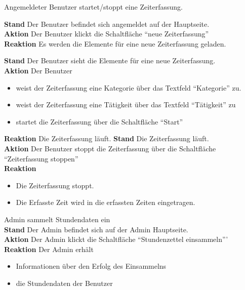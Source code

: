 \begin{requirements}
\begin{requirements}
	\end{requirements}
	 Angemeldeter Benutzer startet/stoppt eine Zeiterfassung.
	\begin{requirements}
            \textbf{Stand} Der Benutzer befindet sich angemeldet auf der Hauptseite. \\
            \textbf{Aktion} Der Benutzer klickt die Schaltfläche "`neue Zeiterfassung"' \\
            \textbf{Reaktion} Es werden die Elemente für eine neue Zeiterfassung geladen.
            \item
                \textbf{Stand} Der Benutzer sieht die Elemente für eine neue Zeiterfassung. \\
                \textbf{Aktion} Der Benutzer
                    \begin{itemize}
                        \item weist der Zeiterfassung eine Kategorie über das Textfeld "`Kategorie"' zu.
                        \item weist der Zeiterfassung eine Tätigkeit über das Textfeld "`Tätigkeit"' zu
                        \item startet die Zeiterfassung über die Schaltfläche "`Start"'
                    \end{itemize}
                \textbf{Reaktion} Die Zeiterfassung läuft.
            \textbf{Stand} Die Zeiterfassung läuft. \\
            \textbf{Aktion} Der Benutzer stoppt die Zeiterfassung über die Schaltfläche "`Zeiterfassung stoppen"' \\
            \textbf{Reaktion}
                \begin{itemize}
                    \item Die Zeiterfassung stoppt.
                    \item Die Erfasste Zeit wird in die erfassten Zeiten eingetragen.
                \end{itemize}
	\end{requirements}


	 Admin sammelt Stundendaten ein \\
            \textbf{Stand} Der Admin befindet sich auf der Admin Hauptseite. \\
            \textbf{Aktion} Der Admin klickt die Schaltfläche "`Stundenzettel einsammeln"'' \\
            \textbf{Reaktion} Der Admin erhält
                \begin{itemize}
                    \item Informationen über den Erfolg des Einsammelns
                    \item die Stundendaten der Benutzer
                \end{itemize}


\end{requirements}
